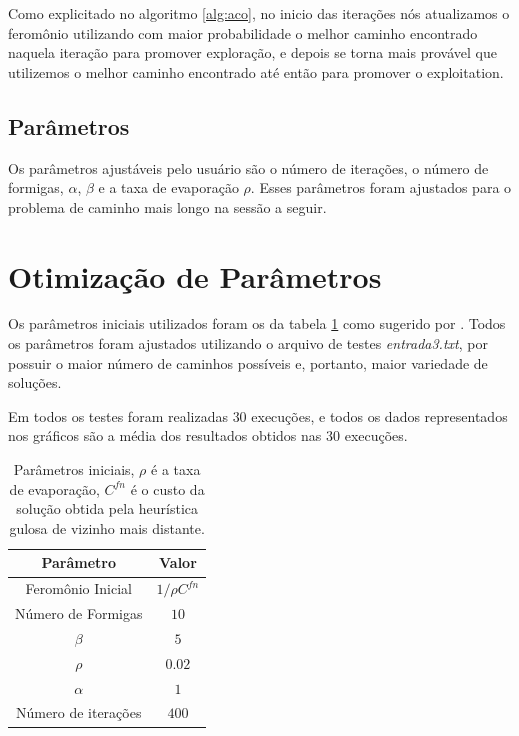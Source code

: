 \documentclass[10pt,twocolumn,letterpaper]{article}
\begin{document}
Como explicitado no algoritmo \ref{alg:aco}, no inicio das iterações nós atualizamos o feromônio utilizando com maior probabilidade o melhor caminho encontrado naquela iteração para promover exploração, e depois se torna mais provável que utilizemos o melhor caminho encontrado até então para promover o exploitation.

\subsection{Parâmetros}

Os parâmetros ajustáveis pelo usuário são o número de iterações, o número de formigas, $\alpha$, $\beta$ e a taxa de evaporação $\rho$. Esses parâmetros foram ajustados para o problema de caminho mais longo na sessão a seguir.

\section{Otimização de Parâmetros}

Os parâmetros iniciais utilizados foram os da tabela \ref{tab:paraminit} como sugerido por \citeauthor{Dorigo2004}\cite{Dorigo2004}. Todos os parâmetros foram ajustados utilizando o arquivo de testes \textit{entrada3.txt}, por possuir o maior número de caminhos possíveis e, portanto, maior variedade de soluções.

Em todos os testes foram realizadas $30$ execuções, e todos os dados representados nos gráficos são a média dos resultados obtidos nas $30$ execuções.

\begin{table}[H]
   \caption{Parâmetros iniciais, $\rho$ é a taxa de evaporação, $C^{fn}$ é o custo da solução obtida pela heurística gulosa de vizinho mais distante.}
   \centering
   \begin{tabular}{|c|c|}
      \hline
      Parâmetro           & Valor           \\
      \hline\hline
      Feromônio Inicial   & $1/\rho C^{fn}$ \\
      \hline
      Número de Formigas  & $10$            \\
      \hline
      $\beta$             & $5$             \\
      \hline
      $\rho$              & $0.02$          \\
      \hline
      $\alpha$            & $1$             \\
      \hline
      Número de iterações & $400$           \\
      \hline
   \end{tabular}
   \label{tab:paraminit}

\end{table}
\end{document}
